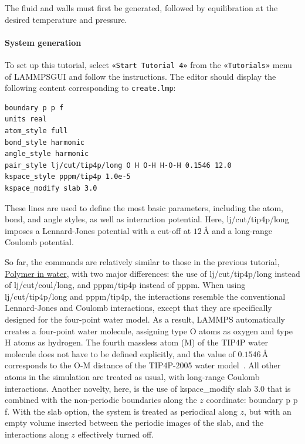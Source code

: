 \documentclass[9pt,tutorial]{livecoms}
\newcommand{\lmpcmd}[1]{\hspace{0pt}\colorbox{listing}{\textcolor{command}{\small{#1}}}\hspace{0pt}} %
\newcommand{\flecmd}[1]{\textcolor{command}{\texttt{#1}}} %
\newcommand{\guicmd}[1]{\textcolor{command}{\texttt{«#1»}}} %
\newcommand{\lammpsgui}{\textsf{LAMMPS\textendash GUI}}
\begin{document}
The fluid and walls must first be generated, followed by equilibration at the
desired temperature and pressure.

\paragraph{System generation}

To set up this tutorial, select \guicmd{Start Tutorial 4} from the
\guicmd{Tutorials} menu of \lammpsgui{} and follow the instructions.
The editor should display the following content corresponding to \flecmd{create.lmp}:
\begin{lstlisting}
boundary p p f
units real
atom_style full
bond_style harmonic
angle_style harmonic
pair_style lj/cut/tip4p/long O H O-H H-O-H 0.1546 12.0
kspace_style pppm/tip4p 1.0e-5
kspace_modify slab 3.0
\end{lstlisting}
These lines are used to define the most basic parameters, including the
atom, bond, and angle styles, as well as interaction
potential.  Here, \lmpcmd{lj/cut/tip4p/long} imposes a Lennard-Jones potential with
a cut-off at $12\,\text{\AA{}}$ and a long-range Coulomb potential.

So far, the commands are relatively similar to those in the previous tutorial,
\hyperref[all-atom-label]{Polymer in water}, with two major differences: the use
of \lmpcmd{lj/cut/tip4p/long} instead of \lmpcmd{lj/cut/coul/long}, and \lmpcmd{pppm/tip4p}
instead of \lmpcmd{pppm}.  When using \lmpcmd{lj/cut/tip4p/long} and \lmpcmd{pppm/tip4p},
the interactions resemble the conventional Lennard-Jones and Coulomb interactions,
except that they are specifically designed for the four-point water model.  As a result,
LAMMPS automatically creates a four-point water molecule, assigning type O
atoms as oxygen and type H atoms as hydrogen.  The fourth massless atom (M) of the
TIP4P water molecule does not have to be defined explicitly, and the value of
$0.1546\,\text{\AA{}}$ corresponds to the O-M distance of the
TIP4P-2005 water model~\cite{abascal2005general}.  All other atoms in the simulation
are treated as usual, with long-range Coulomb interactions.  Another novelty, here, is
the use of \lmpcmd{kspace\_modify slab 3.0} that is combined with the non-periodic
boundaries along the $z$ coordinate: \lmpcmd{boundary p p f}.  With the \lmpcmd{slab}
option, the system is treated as periodical along $z$, but with an empty volume inserted
between the periodic images of the slab, and the interactions along $z$ effectively turned off.
\end{document}
